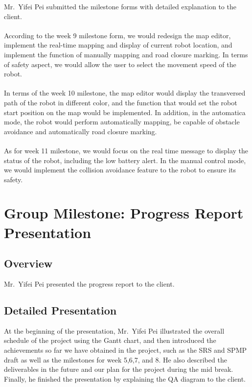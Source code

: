 \documentclass[12pt, a4paper]{article}
\begin{document}
Mr.~Yifei Pei submitted the milestone forms with detailed explanation to the client. \\
\\
According to the week 9 milestone form, we would redesign the map editor, implement the real-time mapping and display of current robot location, and implement the function of manually mapping and road closure marking. In terms of safety aspect, we would allow the user to select the movement speed of the robot.\\
\\
In terms of the week 10 milestone, the map editor would display the transversed path of the robot in different color, and the function that would set the robot start position on the map would be implemented. In addition, in the automatica mode, the robot would perform automatically mapping, be capable of obstacle avoidance and automatically road closure marking.\\
\\
As for week 11 milestone, we would focus on the real time message to display the status of the robot, including the low battery alert. In the manual control mode, we would implement the collision avoidance feature to the robot to ensure its safety.


\section{Group Milestone: Progress Report Presentation}

\subsection{Overview}

Mr.~Yifei Pei presented the progress report to the client.

\subsection{Detailed Presentation}

At the beginning of the presentation, Mr.~Yifei Pei illustrated the overall schedule of the project using the Gantt chart, and then introduced the achievements so far we have obtained in the project, such as the SRS and SPMP draft as well as the milestones for week 5,6,7, and 8. He also described the deliverables in the future and our plan for the project during the mid break. Finally, he finished the presentation by explaining the QA diagram to the client.
\end{document}
